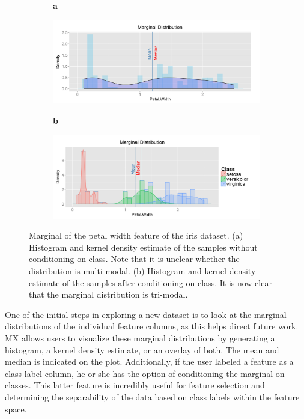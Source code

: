 \documentclass{article}
\begin{document}
\begin{figure}[t!]
	\centering
	\begin{subfigure}[t]{0.01\textwidth}
		\textbf{a}
	\end{subfigure}
	\begin{subfigure}[t]{0.48\textwidth}
		\includegraphics[width=\textwidth,valign=t]{Figures/Iris/MarginalPetalWidthnocond.png}
		\subcaption{}
		\label{fig:FigMarginalNoCond}
	\end{subfigure}\hfill
	\begin{subfigure}[t]{0.01\textwidth}
		\textbf{b}
	\end{subfigure}
	\begin{subfigure}[t]{0.48\textwidth}
		\includegraphics[width=\textwidth,valign=t]{Figures/Iris/MarginalPetalWidth.png}
		\subcaption{}
		\label{fig:FigMarginal}
	\end{subfigure}
	\vspace{-1.5\baselineskip}
	\caption{Marginal of the petal width feature of the iris dataset. (a) Histogram and kernel density estimate of the samples without conditioning on class. Note that it is unclear whether the distribution is multi-modal. (b) Histogram and kernel density estimate of the samples after conditioning on class. It is now clear that the marginal distribution is tri-modal.}
	\label{fig:FigSample}
\end{figure}

One of the initial steps in exploring a new dataset is to look at the marginal distributions of the individual feature columns, as this helps direct future work. MX allows users to visualize these marginal distributions by generating a histogram, a kernel density estimate, or an overlay of both. The mean and median is indicated on the plot. Additionally, if the user labeled a feature as a class label column, he or she has the option of conditioning the marginal on classes. This latter feature is incredibly useful for feature selection and determining the separability of the data based on class labels within the feature space.
\end{document}
